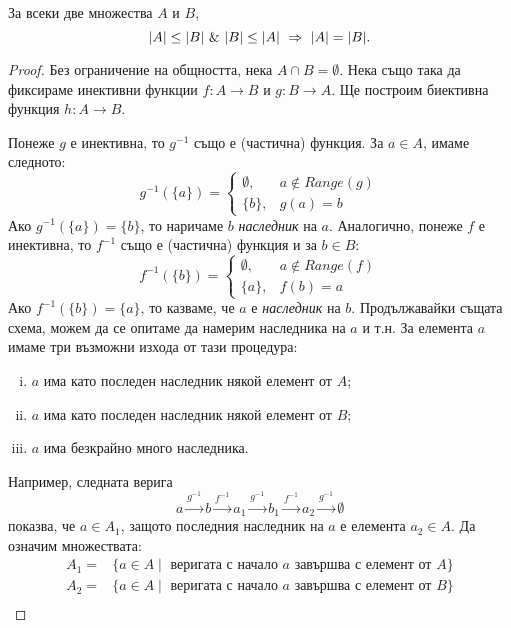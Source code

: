 \begin{thm}
  \label{th:ksb}
  За всеки две множества $A$ и $B$,
  \[\abs{A}\leq\abs{B}\ \&\ \abs{B}\leq\abs{A}\ \Rightarrow\ \abs{A} = \abs{B}.\]
\end{thm}
\begin{proof}
  Без ограничение на общността, нека $A\cap B = \emptyset$.
  Нека също така да фиксираме инективни функции $f:A\rightarrow B$ и $g:B\rightarrow A$.
  Ще построим биективна функция $h:A\rightarrow B$.
  
  Понеже $g$ е инективна, то $g^{-1}$ също е (частична) функция. За $a\in A$, имаме следното:
  \[
  g^{-1}(\{a\}) = 
  \begin{cases}
    \emptyset, & a \not\in Range(g)\\
    \{b\}, & g(a) = b 
  \end{cases}
  \]
  Ако $g^{-1}(\{a\}) = \{b\}$, то наричаме $b$ {\em наследник} на $a$.
  Аналогично, понеже $f$ е инективна, то $f^{-1}$ също е (частична) функция и за $b\in B$:
  \[
  f^{-1}(\{b\}) = 
  \begin{cases}
    \emptyset, & a \not\in Range(f)\\
    \{a\}, & f(b) = a 
  \end{cases}
  \]
  Ако $f^{-1}(\{b\}) = \{a\}$, то казваме, че $a$ е {\em наследник} на $b$.
  Продължавайки същата схема, можем да се опитаме да намерим наследника на $a$ и т.н.
  За елемента $a$ имаме три възможни изхода от тази процедура:
  \begin{enumerate}[i)]
  \item
    $a$ има като последен наследник някой елемент от $A$;
  \item
    $a$ има като последен наследник някой елемент от $B$;
  \item
    $a$ има безкрайно много наследника.
\end{enumerate}
Например, следната верига
\[a \stackrel{g^{-1}}{\longrightarrow} b \stackrel{f^{-1}}{\longrightarrow}a_1 \stackrel{g^{-1}}{\longrightarrow} b_1 \stackrel{f^{-1}}{\longrightarrow}a_2\stackrel{g^{-1}}{\longrightarrow}\emptyset\]
показва, че $a \in A_1$, защото последния наследник на $a$ е елемента $a_2 \in A$.
Да означим множествата:
\begin{align*}
  A_1 = & \{a\in A \mid \mbox{ веригата с начало $a$ завършва с елемент от } A\}\\
  A_2 = & \{a\in A \mid \mbox{ веригата с начало $a$ завършва с елемент от } B\}\\

\end{align*}
\end{proof}
